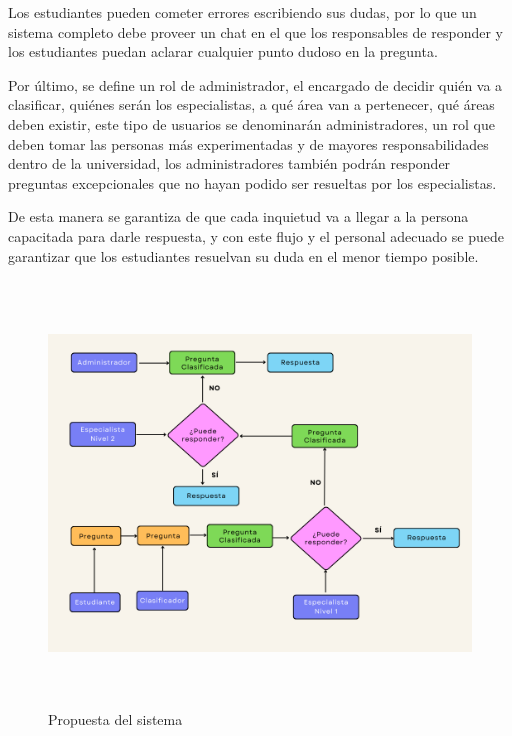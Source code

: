  Los estudiantes pueden cometer errores escribiendo sus dudas, por lo que un sistema completo debe proveer un chat en el que los responsables de responder y los estudiantes puedan aclarar cualquier punto dudoso en la pregunta.
 \newline
 
  Por último, se define un rol de administrador, el encargado de decidir quién va a clasificar, quiénes serán los especialistas, a qué área van a pertenecer, qué áreas deben existir, este tipo de usuarios se denominarán administradores, un rol que deben tomar las personas más experimentadas y de mayores responsabilidades dentro de la universidad, los administradores también podrán responder preguntas excepcionales que no hayan podido ser resueltas por los especialistas.
  \newline
  
   De esta manera se garantiza de que cada inquietud va a llegar a la persona capacitada para darle respuesta, y con este flujo y el personal adecuado se puede garantizar que los estudiantes resuelvan su duda en el menor tiempo posible.
\newline


\begin{figure}[h]
	\includegraphics[width=15cm, height=11.25cm]{thesis_diagram.png}
	\caption{Propuesta del sistema}
	\label{fig:myprop}
\end{figure}


